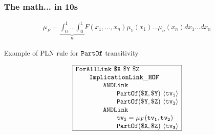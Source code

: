 \documentclass{beamer}
\newcommand{\df}{\mu} %
\newcommand{\fv}{x} %
\newcommand{\PRl}{{\tt PartOf}}
\newcommand{\IMPLHOF}{{\tt ImplicationLink\_HOF}}
\newcommand{\AND}{{\tt ANDLink}}
\newcommand{\FORALL}{{\tt ForAllLink}}
\newcommand{\VX}{{\tt \$X}}
\newcommand{\VY}{{\tt \$Y}}
\newcommand{\VZ}{{\tt \$Z}}
\newcommand{\TVA}{{\tt tv_1}}
\newcommand{\TVB}{{\tt tv_2}}
\newcommand{\TVC}{{\tt tv_3}}
\newcommand{\BTVA}{\langle \TVA \rangle}
\newcommand{\BTVB}{\langle \TVB \rangle}
\newcommand{\BTVC}{\langle \TVC \rangle}
\newcommand{\SP}{\qquad}
\begin{document}
\frame
{
  \frametitle{The math... in 10s}
  \begin{equation*}
    \label{eq:fuzzyprob}
    \begin{array}{c}
      \df_F =
      \underbrace{\displaystyle\int_0^1 \ldots \displaystyle\int_0^1}_n 
      F(\fv_1, \ldots, \fv_n) \df_1(\fv_1)\ldots\df_n(\fv_n)d\fv_1\ldots d\fv_n
    \end{array}
  \end{equation*}

  Example of PLN rule for $\PRl$ transitivity

  \begin{equation*}
    \begin{array}{|l|}
      \hline
      \FORALL\ \VX\ \VY\ \VZ\\
      \SP \IMPLHOF\\
      \SP\SP \AND\\
      \SP\SP\SP \PRl(\VX,\VY)\ \BTVA\\
      \SP\SP\SP \PRl(\VY,\VZ)\ \BTVB\\
      \SP\SP \AND\\
      \SP\SP\SP \TVC = \df_{F}(\TVA,\TVB)\\
      \SP\SP\SP \PRl(\VX,\VZ)\ \BTVC\\
      \hline
    \end{array}
  \end{equation*}
}
\end{document}

